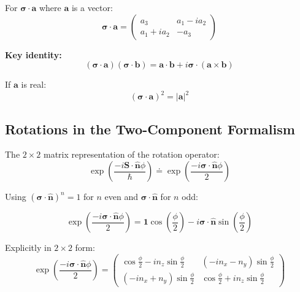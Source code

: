 \documentclass[11pt,a4paper]{article}
\begin{document}
For $\boldsymbol{\sigma}\cdot\mathbf{a}$ where $\mathbf{a}$ is a vector:
\begin{equation}
\boldsymbol{\sigma}\cdot\mathbf{a} = \begin{pmatrix} a_3 & a_1 - ia_2 \\ a_1 + ia_2 & -a_3 \end{pmatrix}
\tag{3.56}
\end{equation}

\textbf{Key identity:}
\begin{equation}
\boxed{(\boldsymbol{\sigma}\cdot\mathbf{a})(\boldsymbol{\sigma}\cdot\mathbf{b}) = \mathbf{a}\cdot\mathbf{b} + i\boldsymbol{\sigma}\cdot(\mathbf{a}\times\mathbf{b})}
\tag{3.57}
\end{equation}

If $\mathbf{a}$ is real:
\begin{equation}
(\boldsymbol{\sigma}\cdot\mathbf{a})^2 = |\mathbf{a}|^2
\tag{3.59}
\end{equation}

\subsection{Rotations in the Two-Component Formalism}

The $2 \times 2$ matrix representation of the rotation operator:
\begin{equation}
\exp\left(\frac{-i\mathbf{S}\cdot\hat{\mathbf{n}}\phi}{\hbar}\right) \doteq \exp\left(\frac{-i\boldsymbol{\sigma}\cdot\hat{\mathbf{n}}\phi}{2}\right)
\tag{3.60}
\end{equation}

Using $(\boldsymbol{\sigma}\cdot\hat{\mathbf{n}})^n = 1$ for $n$ even and $\boldsymbol{\sigma}\cdot\hat{\mathbf{n}}$ for $n$ odd:

\begin{equation}
\boxed{\exp\left(\frac{-i\boldsymbol{\sigma}\cdot\hat{\mathbf{n}}\phi}{2}\right) = \mathbf{1}\cos\left(\frac{\phi}{2}\right) - i\boldsymbol{\sigma}\cdot\hat{\mathbf{n}}\sin\left(\frac{\phi}{2}\right)}
\tag{3.62}
\end{equation}

Explicitly in $2 \times 2$ form:
\begin{equation}
\boxed{\exp\left(\frac{-i\boldsymbol{\sigma}\cdot\hat{\mathbf{n}}\phi}{2}\right) = \begin{pmatrix} \cos\frac{\phi}{2} - in_z\sin\frac{\phi}{2} & (-in_x - n_y)\sin\frac{\phi}{2} \\ (-in_x + n_y)\sin\frac{\phi}{2} & \cos\frac{\phi}{2} + in_z\sin\frac{\phi}{2} \end{pmatrix}}
\tag{3.63}
\end{equation}
\end{document}
